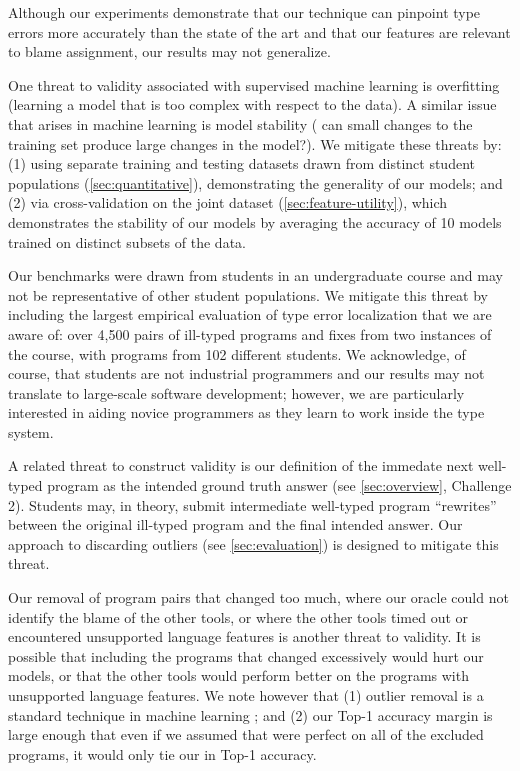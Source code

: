 \label{sec:validity}

Although our experiments demonstrate that our technique can pinpoint type
errors more accurately than the state of the art and that our features are
relevant to blame assignment, our results may not generalize.

One threat to validity associated with supervised machine learning is
overfitting (\ie learning a model that is too complex with respect to
the data).
%
A similar issue that arises in machine learning is model stability (\ie
can small changes to the training set produce large changes in the model?).
%
We mitigate these threats by:
%
(1) using separate training and testing datasets drawn from distinct
student populations (\autoref{sec:quantitative}), demonstrating the
generality of our models; and
%
(2) via cross-validation on the joint dataset
(\autoref{sec:feature-utility}), which demonstrates the stability of our
models by averaging the accuracy of 10 models trained on distinct
subsets of the data.

Our benchmarks were drawn from students in an undergraduate course and
may not be representative of other student populations.
%
We mitigate this threat by including the largest empirical evaluation of
type error localization that we are aware of: over 4,500 pairs of
ill-typed programs and fixes from two instances of the course, with
programs from 102 different students.
%
We acknowledge, of course, that students are not industrial programmers
and our results may not translate to large-scale software development;
however, we are particularly interested in aiding novice programmers
as they learn to work inside the type system.

A related threat to construct validity is our definition of the immedate
next well-typed program as the intended ground truth answer (see
\autoref{sec:overview}, Challenge 2). Students may, in theory, submit
intermediate well-typed program ``rewrites'' between the original ill-typed
program and the final intended answer. Our approach to discarding outliers
(see \autoref{sec:evaluation}) is designed to mitigate this threat.

Our removal of program pairs that changed too much, where our oracle
could not identify the blame of the other tools, or where the other
tools timed out or encountered unsupported language features is another
threat to validity.
%
It is possible that including the programs that changed excessively
would hurt our models, or that the other tools would perform
better on the programs with unsupported language features.
%
We note however that
%
(1) outlier removal is a standard technique in machine learning
; and
%
(2) our Top-1 accuracy margin is large enough that even if we assumed
that \sherrloc were perfect on all of the excluded programs, it would
only tie our \hiddenFH in Top-1 accuracy.
%

